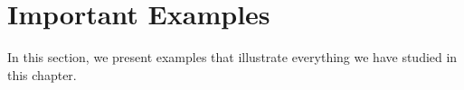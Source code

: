 \section{Important Examples}

In this section, we present examples that illustrate everything we have studied in this chapter.